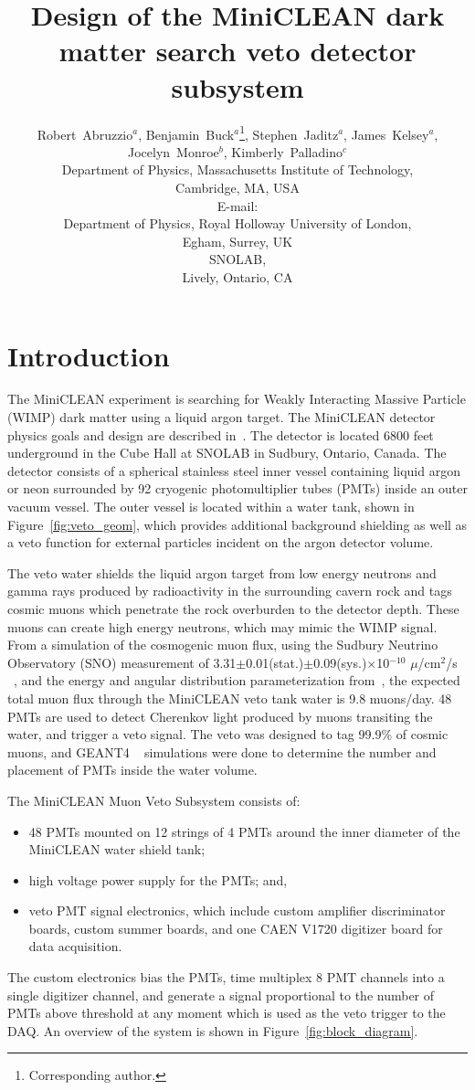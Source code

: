 \documentclass[pdftex]{JINST}
\title{Design of the MiniCLEAN dark matter search veto detector subsystem}
\author{Robert~Abruzzio$^a$, Benjamin~Buck$^a$\thanks{Corresponding author.}, Stephen~Jaditz$^a$, James~Kelsey$^a$, Jocelyn~Monroe$^{b}$, Kimberly~Palladino$^{c}$\\
\llap{$^a$}Department of Physics, Massachusetts Institute of Technology,\\
	Cambridge, MA, USA\\
	E-mail: \email{bbuck@mit.edu}\\
\llap{$^b$}Department of Physics, Royal Holloway University of London,\\
	Egham, Surrey, UK \\
\llap{$^c$}SNOLAB, \\ 
        Lively, Ontario, CA}
\begin{document}
\section{Introduction}
\label{Introduction}
The MiniCLEAN experiment is searching for Weakly Interacting Massive Particle
(WIMP) dark matter using a liquid argon target. The MiniCLEAN detector
physics goals and design are described in~\cite{ref:miniclean_physics}. The
detector is located 6800 feet underground in the Cube Hall at SNOLAB in
Sudbury, Ontario, Canada. The detector consists of a spherical stainless
steel inner vessel containing liquid argon or neon surrounded by 92 cryogenic
photomultiplier tubes (PMTs) inside an outer vacuum vessel. The outer vessel
is located within a water tank, shown in Figure~\ref{fig:veto_geom}, which
provides additional background shielding as well as a veto function for
external particles incident on the argon detector volume. 

The veto water shields the liquid argon target from low energy neutrons and gamma
rays produced by radioactivity in the surrounding cavern rock and tags cosmic muons
which penetrate the rock overburden to the detector depth. These muons can
create high energy neutrons, which may mimic the WIMP signal.
From a simulation of the cosmogenic muon flux, using the Sudbury Neutrino Observatory (SNO) measurement of
3.31$\pm$0.01(stat.)$\pm$0.09(sys.)$\times$10$^{-10}$ $\mu$/cm$^2$/s
~\cite{ref:sno_muon_flux}, and the energy and angular distribution
parameterization from~\cite{ref:mei_and_hime}, the expected total muon flux
through the MiniCLEAN veto tank water is 9.8 muons/day. 48 PMTs are used to
detect Cherenkov light produced by muons transiting the water, and trigger a
veto signal. The veto was designed to tag 99.9\% of cosmic muons, and GEANT4
~\cite{ref:geant4} simulations were done to determine the number and placement
of PMTs inside the water volume. 

The MiniCLEAN Muon Veto Subsystem consists of:
\begin{itemize}
\item 48 PMTs mounted on 12 strings of 4 PMTs around the inner diameter of the MiniCLEAN water shield tank;
\item high voltage power supply for the PMTs; and,
\item veto PMT signal electronics, which include custom amplifier discriminator boards, custom summer boards, and one CAEN V1720 digitizer board for data acquisition. 
\end{itemize}
The custom electronics bias the PMTs, time multiplex 8 PMT channels into a
single digitizer channel, and generate a signal proportional to the number
of PMTs above threshold at any moment which is used as the veto trigger to
the DAQ. An overview of the system is shown in
Figure~\ref{fig:block_diagram}.
\end{document}
